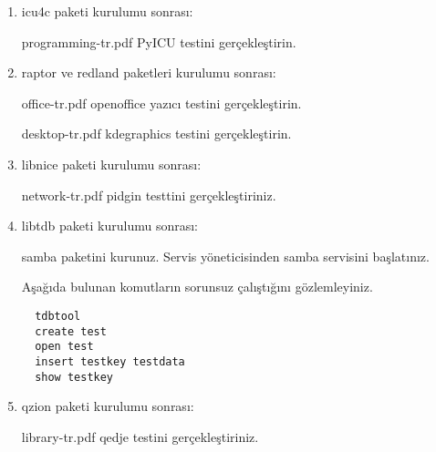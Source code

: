 \documentclass[a4paper,10pt]{article}
\begin{document}
\begin{enumerate}
\item icu4c paketi kurulumu sonrası:

programming-tr.pdf PyICU testini gerçekleştirin.

\item raptor ve redland paketleri kurulumu sonrası:

office-tr.pdf openoffice yazıcı testini gerçekleştirin.

desktop-tr.pdf kdegraphics testini gerçekleştirin.

\item libnice paketi kurulumu sonrası:

network-tr.pdf pidgin testtini gerçekleştiriniz.

\item libtdb paketi kurulumu sonrası:

samba paketini kurunuz. Servis yöneticisinden samba servisini başlatınız.

Aşağıda bulunan komutların sorunsuz çalıştığını gözlemleyiniz.
\begin{verbatim}
  tdbtool
  create test
  open test 
  insert testkey testdata
  show testkey
\end{verbatim}
\item qzion paketi kurulumu sonrası:

library-tr.pdf qedje testini gerçekleştiriniz.

\end{enumerate}
\end{document}
